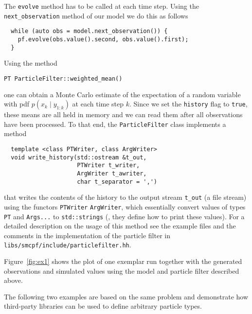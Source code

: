 \begin{example}
  The \texttt{evolve} method has to be called at each time step. Using
  the \texttt{next\_observation} method of our model we do this as
  follows
\begin{verbatim}
  while (auto obs = model.next_observation()) {
    pf.evolve(obs.value().second, obs.value().first);
  }
\end{verbatim}
  Using the method
\begin{verbatim}
PT ParticleFilter::weighted_mean()
\end{verbatim}
  one can obtain a Monte Carlo estimate of the expectation of a random
  variable with pdf $p(x_k \mid y_{1:k})$ at each time step $k$. Since
  we set the \texttt{history} flag to \texttt{true}, these means are
  all held in memory and we can read them after all observations have
  been processed. To that end, the \texttt{ParticleFilter} class
  implements a method
\begin{verbatim}
  template <class PTWriter, class ArgWriter>
  void write_history(std::ostream &t_out, 
                     PTWriter t_writer,
                     ArgWriter t_awriter, 
                     char t_separator = ',')
\end{verbatim}
  that writes the contents of the history to the output stream
  \texttt{t\_out} (\eg a file stream) using the functors
  \texttt{PTWriter} \texttt{ArgWriter}, which essentially convert
  values of types \texttt{PT} and \texttt{Args...} to
  \texttt{std::strings} (\ie, they define how to print these
  values). For a detailed description on the usage of this method see
  the example files and the comments in the implementation of the
  particle filter in \texttt{libs/smcpf/include/particlefilter.hh}.

  Figure~\ref{fig:ex1} shows the plot of one exemplar run together
  with the generated observations and simulated values using the model
  and particle filter described above.
  
\end{example}
The following two examples are based on the same problem and
demonstrate how third-party libraries can be used to define arbitrary
particle types.

